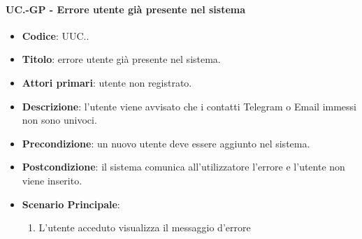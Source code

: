 	\paragraph{UC\theuccount.\thesubuccount-GP - Errore utente già presente nel sistema}
		
		\begin{itemize}
			\item \textbf{Codice}: UUC\theuccount.\thesubuccount.
			\item \textbf{Titolo}: errore utente già presente nel sistema.
			\item \textbf{Attori primari}: utente non registrato.
			\item \textbf{Descrizione}: l’utente viene avvisato che i contatti Telegram o Email immessi non sono univoci.
			\item \textbf{Precondizione}: un nuovo utente deve essere aggiunto nel sistema.
			\item \textbf{Postcondizione}: il sistema comunica all’utilizzatore l’errore e l'utente non viene inserito.
			\item \textbf{Scenario Principale}:
			\begin{enumerate}
				\item L'utente acceduto visualizza il messaggio d'errore
			\end{enumerate}
			\end{itemize}